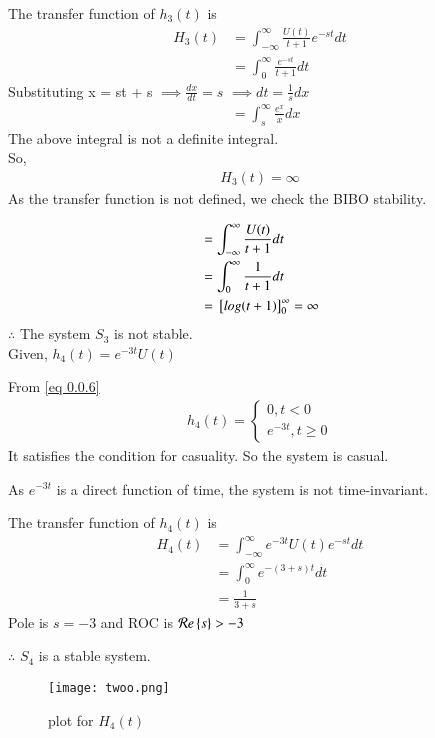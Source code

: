 \documentclass[journal,12pt,twocolumn]{IEEEtran}
\begin{document}
The transfer function of $h_3(t)$ is
\begin{align}
    H_3(t) &= \int_{-\infty}^{\infty} \frac{U(t)}{t+1}e^{-st} dt\\
    &= \int_{0}^{\infty} \frac{e^{-st}}{t+1} dt
\end{align}
Substituting x = st + s 
$\implies \frac{dx}{dt} = s$ $\implies dt = \frac{1}{s}dx$
\begin{align}
    &= \int_{s}^{\infty} \frac{e^x}{x} dx
\end{align}
The above integral is not a definite integral. \\
So, 
\begin{align}
    H_3(t) = \infty
\end{align}
As the transfer function is not defined, we check the BIBO stability.

\begin{align}
   &= \int_{-\infty}^{\infty} \frac{U(t)}{t+1} dt\\
    &= \int_0^{\infty} \frac{1}{t+1} dt\\
    &= {}\left[log(t+1)\right]_0^{\infty} = \infty
\end{align}
$\therefore$ The system $S_3$ is not stable.\\

Given, $h_4(t) = e^{-3t}U(t)$

From \eqref{eq 0.0.6}
\begin{align}
    h_4(t) = 
    \begin{cases}
    0, t<0\\
    e^{-3t}, t\geq 0
    \end{cases}
\end{align}
It satisfies the condition for casuality. So the system is casual.

As $e^{-3t}$ is a direct function of time, the system is not time-invariant.

The transfer function of $h_4(t)$ is 
\begin{align}
    H_4(t) &= \int_{-\infty}^{\infty} e^{-3t}U(t)e^{-st} dt\\
    &= \int_{0}^{\infty} e^{-(3+s)t} dt\\
    &= \frac{1}{3+s}
\end{align}
Pole is $s = -3$ and ROC is $\mathcal{R}e\left\{s\right\} > -3$

$\therefore$ $S_4$ is a stable system.

\begin{figure}[htp]
    \centering
    \texttt{[image: twoo.png]}
    \caption{plot for $H_4(t)$}
    \label{fig:my_label}
\end{figure}
\end{document}
